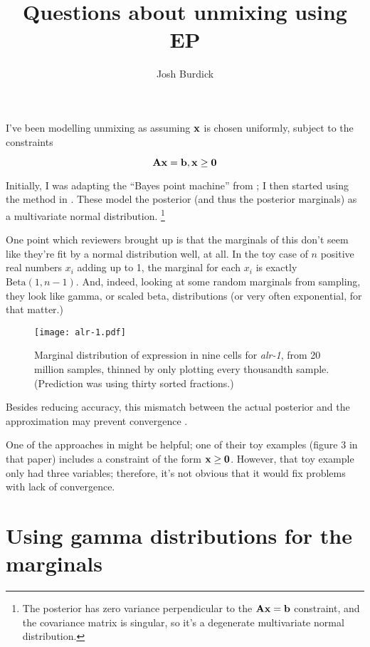 \documentclass[12]{article}
\begin{document}
\title{Questions about unmixing using EP}
\author{Josh Burdick}
\maketitle

I've been modelling unmixing as assuming ${\bf x}$ is chosen uniformly, subject
to the constraints

\[
{\bf Ax} = {\bf b}, {\bf x} \ge {\bf 0}
\]

Initially, I was adapting the ``Bayes point machine''
from \cite{minka_expectation_2001-1}; I then started using the method in
\cite{cseke_approximate_2011}. These model the posterior (and thus the
posterior marginals) as a multivariate normal
distribution.
\footnote{The posterior has zero variance perpendicular to the
${\bf Ax} = {\bf b}$ constraint, and the covariance matrix is singular,
so it's a degenerate multivariate normal distribution.}

One point which reviewers brought up is that the marginals of this don't
seem like they're fit by a normal distribution well, at all. In the toy case
of $n$ positive real numbers $x_i$ adding up to 1, the marginal for each
$x_i$ is exactly $\mathrm{Beta}(1,n-1)$. And, indeed, looking at some random
marginals from sampling, they look like gamma, or scaled beta,
distributions (or very often exponential, for that matter.)

\begin{figure}[htp]
\centering
\texttt{[image: alr-1.pdf]}
\caption{
Marginal distribution of expression in nine cells for
{\em alr-1}, from 20 million samples,
thinned by only plotting every thousandth sample. (Prediction was using thirty
sorted fractions.)
}
\label{fig:alr1}
\end{figure}

Besides reducing accuracy, this mismatch between the actual posterior and the approximation
may prevent convergence \cite{minka_expectation_2001-1}.

One of the approaches in \cite{cseke_approximate_2011} might be helpful; one
of their toy examples (figure 3 in that paper) includes
a constraint of the form ${\bf x} \ge {\bf 0}$. However, that toy example only
had three variables; therefore, it's not obvious that it would fix problems with
lack of convergence.

\section*{Using gamma distributions for the marginals}
\end{document}
